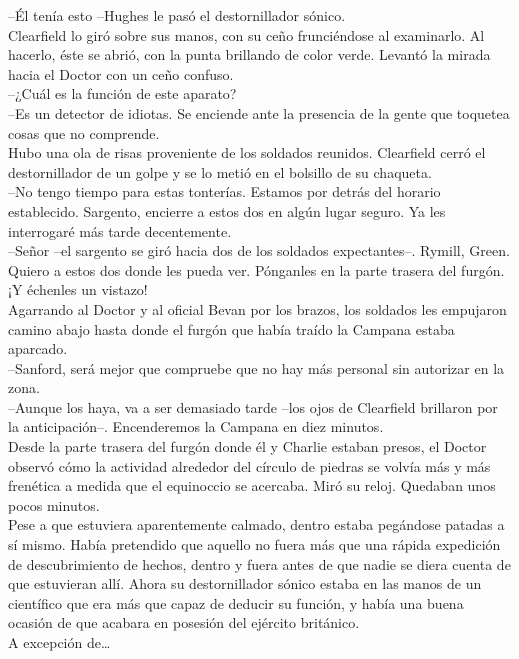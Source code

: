 --Él tenía esto --Hughes le pasó el destornillador sónico.\\
Clearfield lo giró sobre sus manos, con su ceño frunciéndose al
examinarlo. Al hacerlo, éste se abrió, con la punta brillando de color
verde. Levantó la mirada hacia el Doctor con un ceño confuso.\\
--¿Cuál es la función de este aparato?\\
--Es un detector de idiotas. Se enciende ante la presencia de la gente
que toquetea cosas que no comprende.\\
Hubo una ola de risas proveniente de los soldados reunidos. Clearfield
cerró el destornillador de un golpe y se lo metió en el bolsillo de su
chaqueta.\\
--No tengo tiempo para estas tonterías. Estamos por detrás del horario
establecido. Sargento, encierre a estos dos en algún lugar seguro. Ya
les interrogaré más tarde decentemente.\\
--Señor --el sargento se giró hacia dos de los soldados expectantes--.
Rymill, Green. Quiero a estos dos donde les pueda ver. Pónganles en la
parte trasera del furgón. ¡Y échenles un vistazo!\\
Agarrando al Doctor y al oficial Bevan por los brazos, los soldados les
empujaron camino abajo hasta donde el furgón que había traído la Campana
estaba aparcado.\\
--Sanford, será mejor que compruebe que no hay más personal sin
autorizar en la zona.\\
--Aunque los haya, va a ser demasiado tarde --los ojos de Clearfield
brillaron por la anticipación--. Encenderemos la Campana en diez
minutos.\\[2\baselineskip]Desde la parte trasera del furgón donde él y
Charlie estaban presos, el Doctor observó cómo la actividad alrededor
del círculo de piedras se volvía más y más frenética a medida que el
equinoccio se acercaba. Miró su reloj. Quedaban unos pocos minutos.\\
Pese a que estuviera aparentemente calmado, dentro estaba pegándose
patadas a sí mismo. Había pretendido que aquello no fuera más que una
rápida expedición de descubrimiento de hechos, dentro y fuera antes de
que nadie se diera cuenta de que estuvieran allí. Ahora su
destornillador sónico estaba en las manos de un científico que era más
que capaz de deducir su función, y había una buena ocasión de que
acabara en posesión del ejército británico.\\
A excepción de\ldots{}\\
